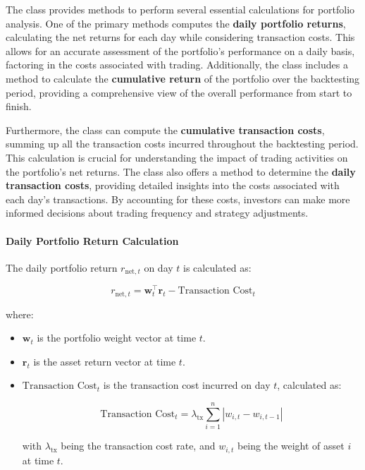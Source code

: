 The class provides methods to perform several essential calculations for portfolio analysis. One of the primary methods computes the \textbf{daily portfolio returns}, calculating the net returns for each day while considering transaction costs. This allows for an accurate assessment of the portfolio's performance on a daily basis, factoring in the costs associated with trading. Additionally, the class includes a method to calculate the \textbf{cumulative return} of the portfolio over the backtesting period, providing a comprehensive view of the overall performance from start to finish.

Furthermore, the class can compute the \textbf{cumulative transaction costs}, summing up all the transaction costs incurred throughout the backtesting period. This calculation is crucial for understanding the impact of trading activities on the portfolio's net returns. The class also offers a method to determine the \textbf{daily transaction costs}, providing detailed insights into the costs associated with each day's transactions. By accounting for these costs, investors can make more informed decisions about trading frequency and strategy adjustments.

\paragraph{Daily Portfolio Return Calculation}

The daily portfolio return \( r_{\text{net}, t} \) on day \( t \) is calculated as:

\[
r_{\text{net}, t} = \mathbf{w}_t^\top \mathbf{r}_t - \text{Transaction Cost}_t
\]

where:

\begin{itemize}
    \item \( \mathbf{w}_t \) is the portfolio weight vector at time \( t \).
    \item \( \mathbf{r}_t \) is the asset return vector at time \( t \).
    \item \( \text{Transaction Cost}_t \) is the transaction cost incurred on day \( t \), calculated as:

    \[
    \text{Transaction Cost}_t = \lambda_{\text{tx}} \sum_{i=1}^n |w_{i, t} - w_{i, t-1}|
    \]

    with \( \lambda_{\text{tx}} \) being the transaction cost rate, and \( w_{i, t} \) being the weight of asset \( i \) at time \( t \).
\end{itemize}


